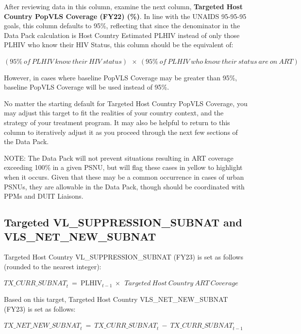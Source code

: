 \documentclass[
  openany]{book}
\begin{document}
After reviewing data in this column, examine the next column, \textbf{Targeted
Host Country PopVLS Coverage (FY22) (\%)}. In line with the UNAIDS
95-95-95 goals, this column defaults to 95\%, reflecting that since the
denominator in the Data Pack calculation is Host Country Estimated PLHIV
instead of only those PLHIV who know their HIV Status, this column
should be the equivalent of:

\begin{center} $(95\%\ of\ PLHIV\ know\ their\ HIV\ status)\ \  \times \ (95\%\ of\ PLHIV\ who\ know\ their\ status\ are\ on\ ART)$ \end{center}

However, in cases where baseline PopVLS Coverage may be greater than
95\%, baseline PopVLS Coverage will be used instead of 95\%.

No matter the starting default for Targeted Host Country PopVLS
Coverage, you may adjust this target to fit the realities of your
country context, and the strategy of your treatment program. It may also
be helpful to return to this column to iteratively adjust it as you
proceed through the next few sections of the Data Pack.

NOTE: The Data Pack will not prevent situations resulting in ART
coverage exceeding 100\% in a given PSNU, but will flag these cases in
yellow to highlight when it occurs. Given that these may be a common
occurrence in cases of urban PSNUs, they are allowable in the Data Pack,
though should be coordinated with PPMs and DUIT Liaisons.

\hypertarget{targeted-vl_suppression_subnat-and-vls_net_new_subnat}{%
\subsection{Targeted VL\_SUPPRESSION\_SUBNAT and VLS\_NET\_NEW\_SUBNAT}\label{targeted-vl_suppression_subnat-and-vls_net_new_subnat}}

Targeted Host Country VL\_SUPPRESSION\_SUBNAT (FY23) is set as follows
(rounded to the nearest integer):

\begin{center} ${TX\_ CURR\_ SUBNAT}_{t}\  = \ \text{PLHIV}_{t - 1}\  \times \ \ Targeted\ Host\ Country\ ART\ Coverage$ \end{center}

Based on this target, Targeted Host Country VLS\_NET\_NEW\_SUBNAT (FY23) is
set as follows:

\begin{center} ${TX\_ NET\_ NEW\_ SUBNAT}_{t}\  = \ {TX\_ CURR\_ SUBNAT}_{t}\  - \ {TX\_ CURR\_ SUBNAT}_{t - 1}$ \end{center}
\end{document}
